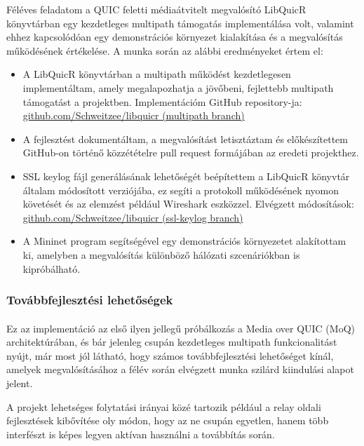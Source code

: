 \documentclass[a4paper,oneside]{article}
\begin{document}
Féléves feladatom a QUIC feletti médiaátvitelt megvalósító LibQuicR könyvtárban egy kezdetleges multipath támogatás 
implementálása volt, valamint ehhez kapcsolódóan egy demonstrációs környezet kialakítása és a megvalósítás 
működésének értékelése. A munka során az alábbi eredményeket értem el:

\begin{itemize}
\item A LibQuicR könyvtárban a multipath működést kezdetlegesen implementáltam, 
amely megalapozhatja a jövőbeni, fejlettebb multipath támogatást a projektben. Implementációm GitHub repository-ja: 
\href{https://github.com/Schweitzee/libquicr/tree/multipath}{github.com/Schweitzee/libquicr (multipath branch)}
\item A fejlesztést dokumentáltam, a megvalósítást letisztáztam és előkészítettem 
GitHub-on történő közzétételre pull request formájában az eredeti projekthez.
\item SSL keylog fájl generálásának lehetőségét beépítettem a LibQuicR könyvtár 
általam módosított verziójába, ez segíti a protokoll működésének nyomon követését 
és az elemzést például Wireshark eszközzel. Elvégzett módosítások: 
\href{https://github.com/Schweitzee/libquicr/tree/ssl-keylog}{github.com/Schweitzee/libquicr (ssl-keylog branch)}
\item A Mininet program segítségével egy demonstrációs környezetet alakítottam ki, 
amelyben a megvalósítás különböző hálózati szcenáriókban is kipróbálható.
\end{itemize}

\subsubsection{Továbbfejlesztési lehetőségek}
\paragraph{}
Ez az implementáció az első ilyen jellegű próbálkozás a Media over QUIC (MoQ) architektúrában, és bár 
jelenleg csupán kezdetleges multipath funkcionalitást nyújt, már most jól látható, hogy számos továbbfejlesztési 
lehetőséget kínál, amelyek megvalósításához a félév során elvégzett munka szilárd kiindulási alapot jelent. 

A projekt lehetséges folytatási irányai közé tartozik például a relay oldali fejlesztések kibővítése oly 
módon, hogy az ne csupán egyetlen, hanem több interfészt is képes legyen aktívan használni a továbbítás 
során. 
\end{document}
